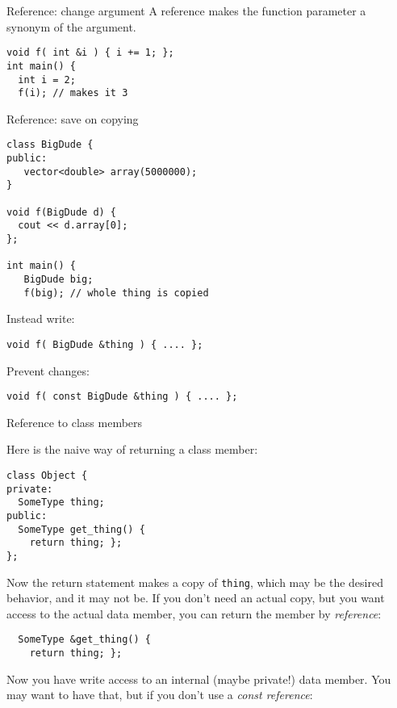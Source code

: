 \begin{block}{Reference: change argument}
\label{sl:refarg-change}
A reference makes the function parameter a synonym of the argument.
\begin{lstlisting}
void f( int &i ) { i += 1; };
int main() {
  int i = 2;
  f(i); // makes it 3
\end{lstlisting}
\end{block}

\begin{block}{Reference: save on copying}
\label{sl:refarg-nocopy}
\begin{multicols}{2}
\begin{lstlisting}
class BigDude {
public:
   vector<double> array(5000000);
}

void f(BigDude d) {
  cout << d.array[0];
};

int main() {
   BigDude big;
   f(big); // whole thing is copied
\end{lstlisting}
\columnbreak
Instead write:
\begin{lstlisting}
void f( BigDude &thing ) { .... };
\end{lstlisting}
Prevent changes:
\begin{lstlisting}
void f( const BigDude &thing ) { .... };
\end{lstlisting}
\hbox{}\vfill\hbox{}
\end{multicols}
\end{block}

 {Reference to class members}
\label{sec:class-ref}

Here is the naive way of returning a class member:
\begin{lstlisting}
class Object {
private:
  SomeType thing;
public:
  SomeType get_thing() {
    return thing; };
};
\end{lstlisting}
Now the return statement makes a copy of \lstinline{thing},
which may be the desired behavior, and it may not be.
If you don't need an actual copy,
but you want access to the actual data member,
you can return the member by
\emph{reference}:
\begin{lstlisting}
  SomeType &get_thing() { 
    return thing; };
\end{lstlisting}
Now you have write access to an internal (maybe private!) data member.
You may want to have that, but if you don't
use a
\emph{const reference}:
%

